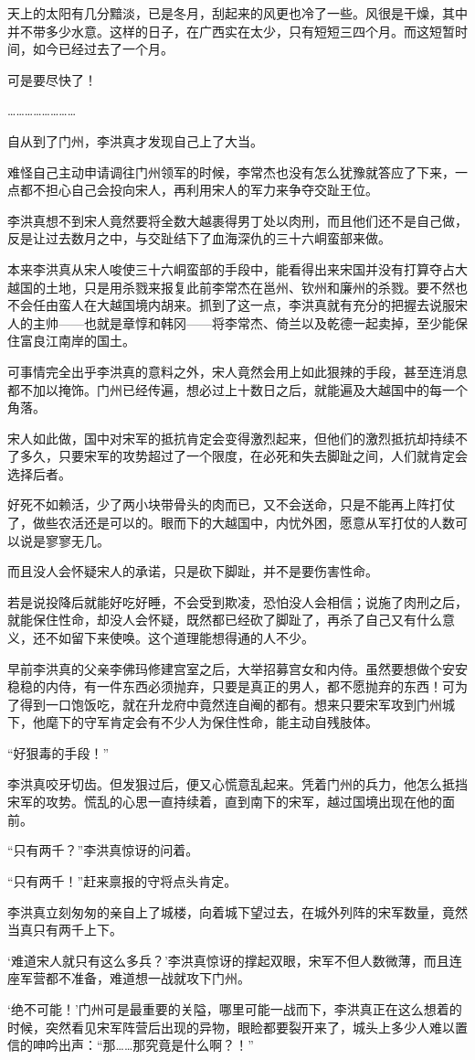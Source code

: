 天上的太阳有几分黯淡，已是冬月，刮起来的风更也冷了一些。风很是干燥，其中并不带多少水意。这样的日子，在广西实在太少，只有短短三四个月。而这短暂时间，如今已经过去了一个月。

可是要尽快了！

……………………

自从到了门州，李洪真才发现自己上了大当。

难怪自己主动申请调往门州领军的时候，李常杰也没有怎么犹豫就答应了下来，一点都不担心自己会投向宋人，再利用宋人的军力来争夺交趾王位。

李洪真想不到宋人竟然要将全数大越裹得男丁处以肉刑，而且他们还不是自己做，反是让过去数月之中，与交趾结下了血海深仇的三十六峒蛮部来做。

本来李洪真从宋人唆使三十六峒蛮部的手段中，能看得出来宋国并没有打算夺占大越国的土地，只是用杀戮来报复此前李常杰在邕州、钦州和廉州的杀戮。要不然也不会任由蛮人在大越国境内胡来。抓到了这一点，李洪真就有充分的把握去说服宋人的主帅——也就是章惇和韩冈——将李常杰、倚兰以及乾德一起卖掉，至少能保住富良江南岸的国土。

可事情完全出乎李洪真的意料之外，宋人竟然会用上如此狠辣的手段，甚至连消息都不加以掩饰。门州已经传遍，想必过上十数日之后，就能遍及大越国中的每一个角落。

宋人如此做，国中对宋军的抵抗肯定会变得激烈起来，但他们的激烈抵抗却持续不了多久，只要宋军的攻势超过了一个限度，在必死和失去脚趾之间，人们就肯定会选择后者。

好死不如赖活，少了两小块带骨头的肉而已，又不会送命，只是不能再上阵打仗了，做些农活还是可以的。眼而下的大越国中，内忧外困，愿意从军打仗的人数可以说是寥寥无几。

而且没人会怀疑宋人的承诺，只是砍下脚趾，并不是要伤害性命。

若是说投降后就能好吃好睡，不会受到欺凌，恐怕没人会相信；说施了肉刑之后，就能保住性命，却没人会怀疑，既然都已经砍了脚趾了，再杀了自己又有什么意义，还不如留下来使唤。这个道理能想得通的人不少。

早前李洪真的父亲李佛玛修建宫室之后，大举招募宫女和内侍。虽然要想做个安安稳稳的内侍，有一件东西必须抛弃，只要是真正的男人，都不愿抛弃的东西！可为了得到一口饱饭吃，就在升龙府中竟然连自阉的都有。想来只要宋军攻到门州城下，他麾下的守军肯定会有不少人为保住性命，能主动自残肢体。

“好狠毒的手段！”

李洪真咬牙切齿。但发狠过后，便又心慌意乱起来。凭着门州的兵力，他怎么抵挡宋军的攻势。慌乱的心思一直持续着，直到南下的宋军，越过国境出现在他的面前。

“只有两千？”李洪真惊讶的问着。

“只有两千！”赶来禀报的守将点头肯定。

李洪真立刻匆匆的亲自上了城楼，向着城下望过去，在城外列阵的宋军数量，竟然当真只有两千上下。

‘难道宋人就只有这么多兵？’李洪真惊讶的撑起双眼，宋军不但人数微薄，而且连座军营都不准备，难道想一战就攻下门州。

‘绝不可能！’门州可是最重要的关隘，哪里可能一战而下，李洪真正在这么想着的时候，突然看见宋军阵营后出现的异物，眼睑都要裂开来了，城头上多少人难以置信的呻吟出声：“那……那究竟是什么啊？！”

